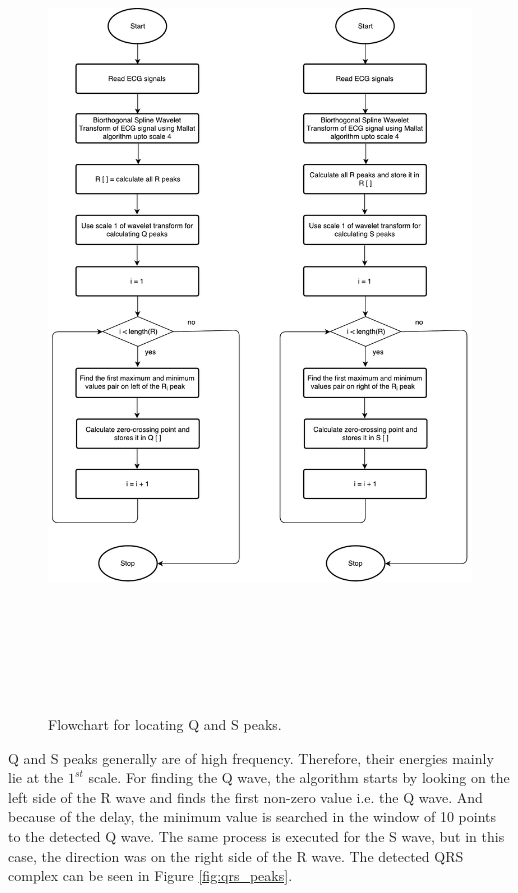\begin{figure}[htpb]
	\centering
	\includegraphics[width=25cm,height=22cm,keepaspectratio=true]{images/q-and-s.pdf}
	\caption{
		Flowchart for locating Q and S peaks.
	}
	\label{fig:qs}
\end{figure}

\bigskip

Q and S peaks generally are of high frequency. Therefore, their energies mainly lie at the $1^{st}$ scale. For finding the Q wave, the algorithm starts by looking on the left side of the R wave and finds the first non-zero value i.e. the Q wave. And because of the delay, the minimum value is searched in the window of 10 points to the detected Q wave. The same process is executed for the S wave, but in this case, the direction was on the right side of the R wave. The detected QRS complex can be seen in Figure \ref{fig:qrs_peaks}.

